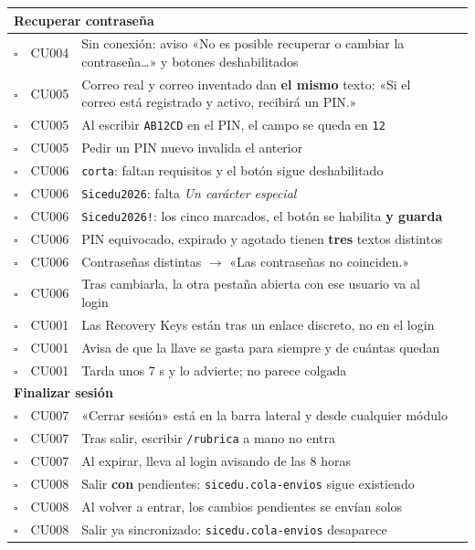 \documentclass[11pt,a4paper]{article}
\newcommand{\ruta}[1]{\textcolor{azulmarino}{\texttt{#1}}}
\newcommand{\ok}{$\square$}
\newcommand{\flecha}{$\rightarrow$}
\begin{document}
\begin{longtable}{|c|p{1.9cm}|p{6.1cm}|p{4.3cm}|}
\multicolumn{4}{|l|}{\cellcolor{grisclaro}\textbf{Recuperar contraseña}} \\ \hline
\ok & CU004 & Sin conexión: aviso «No es posible recuperar o cambiar la contraseña\ldots» y botones deshabilitados & \\[0.5cm] \hline
\ok & CU005 & Correo real y correo inventado dan \textbf{el mismo} texto: «Si el correo está registrado y activo, recibirá un PIN.» & \\[0.5cm] \hline
\ok & CU005 & Al escribir \texttt{AB12CD} en el PIN, el campo se queda en \texttt{12} & \\[0.5cm] \hline
\ok & CU005 & Pedir un PIN nuevo invalida el anterior & \\[0.5cm] \hline
\ok & CU006 & \texttt{corta}: faltan requisitos y el botón sigue deshabilitado & \\[0.5cm] \hline
\ok & CU006 & \texttt{Sicedu2026}: falta \emph{Un carácter especial} & \\[0.5cm] \hline
\ok & CU006 & \texttt{Sicedu2026!}: los cinco marcados, el botón se habilita \textbf{y guarda} & \\[0.5cm] \hline
\ok & CU006 & PIN equivocado, expirado y agotado tienen \textbf{tres} textos distintos & \\[0.5cm] \hline
\ok & CU006 & Contraseñas distintas \flecha{} «Las contraseñas no coinciden.» & \\[0.5cm] \hline
\ok & CU006 & Tras cambiarla, la otra pestaña abierta con ese usuario va al login & \\[0.5cm] \hline
\ok & CU001 & Las Recovery Keys están tras un enlace discreto, no en el login & \\[0.5cm] \hline
\ok & CU001 & Avisa de que la llave se gasta para siempre y de cuántas quedan & \\[0.5cm] \hline
\ok & CU001 & Tarda unos 7 s y lo advierte; no parece colgada & \\[0.5cm] \hline

\multicolumn{4}{|l|}{\cellcolor{grisclaro}\textbf{Finalizar sesión}} \\ \hline
\ok & CU007 & «Cerrar sesión» está en la barra lateral y desde cualquier módulo & \\[0.5cm] \hline
\ok & CU007 & Tras salir, escribir \ruta{/rubrica} a mano no entra & \\[0.5cm] \hline
\ok & CU007 & Al expirar, lleva al login avisando de las 8 horas & \\[0.5cm] \hline
\ok & CU008 & Salir \textbf{con} pendientes: \texttt{sicedu.cola-envios} sigue existiendo & \\[0.5cm] \hline
\ok & CU008 & Al volver a entrar, los cambios pendientes se envían solos & \\[0.5cm] \hline
\ok & CU008 & Salir ya sincronizado: \texttt{sicedu.cola-envios} desaparece & \\[0.5cm] \hline


\end{longtable}
\end{document}

